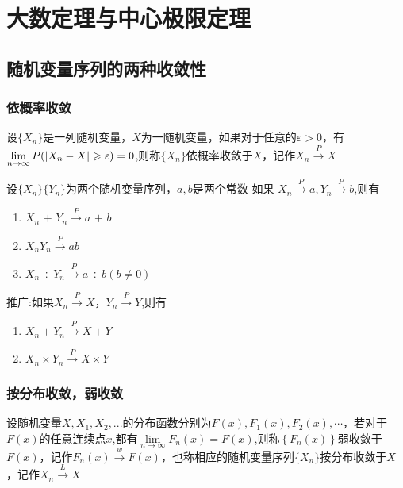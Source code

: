 \chapter{大数定理与中心极限定理}
\section{随机变量序列的两种收敛性}
\subsection{依概率收敛}
\begin{definition}
    设$\{X_n\}$是一列随机变量，$X$为一随机变量，如果对于任意的$\varepsilon>0$，有$\mathop {\lim }\limits_{n \to \infty } P( \\| {{X_n} - X} | \geqslant \varepsilon )  = 0$,则称$\{X_n\}$依概率收敛于$X$，记作$X_n \xrightarrow{P} X$
\end{definition}

\begin{theorem}
    设$\{X_n\}$$\{Y_n\}$为两个随机变量序列，$a,b$是两个常数
        如果 ${X_n}\mathop  \to \limits^P a,{Y_n}\mathop  \to \limits^P b$,则有
    \begin{enumerate}
        \item ${X_n}{\text{ + }}{Y_n}\mathop  \to \limits^P a{\text{ + }}b$
        \item ${X_n}{Y_n}\mathop  \to \limits^P ab$
        \item ${X_n} \div {Y_n}\mathop  \to \limits^P a \div b(b \ne 0)$
    \end{enumerate}

\end{theorem}

推广:如果$X_n \xrightarrow{P} X$，$Y_n \xrightarrow{P} Y$,则有
\begin{enumerate}
    \item $X_n +Y_n \xrightarrow{P} X+Y$
    \item $X_n \times Y_n\xrightarrow{P} X \times Y$
\end{enumerate}

\subsection{按分布收敛，弱收敛}
\begin{definition}
    设随机变量$X,{X_1},{X_2},...$的分布函数分别为$F(x),{F_1}(x),{F_2}(x),\cdots$，若对于$F(x)$的任意连续点$x$,都有$\mathop {\lim }\limits_{n \to \infty } {F_n}(x) = F(x)$,则称$\left\{ {{F_n}(x)} \right\}$弱收敛于$F(x)$，记作${F_n}(x) \xrightarrow{w} F(x)$，也称相应的随机变量序列$\{X_n\}$按分布收敛于$X$，记作$X_n \xrightarrow{L} X$
\end{definition}

